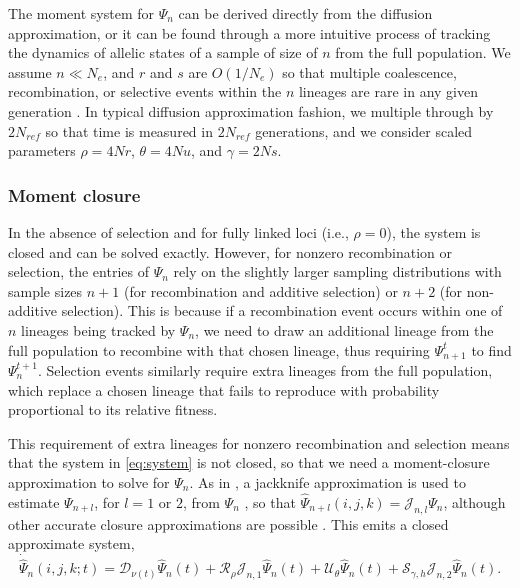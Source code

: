 \documentclass[]{article}
\begin{document}
The moment system for \(\Psi_n\) can be derived directly from the diffusion
approximation, or it can be found through a more intuitive process of tracking
the dynamics of allelic states of a sample of size of \(n\) from the full
population. We assume \(n \ll N_e\), and \(r\) and \(s\) are \(O(1/N_e)\) so
that multiple coalescence, recombination, or selective events within the \(n\)
lineages are rare in any given generation \citep[Supporting
Information;][]{Jouganous2017-pq,Ragsdale2019-nt}. In typical diffusion
approximation fashion, we multiple through by \(2N_{ref}\) so that time is
measured in \(2N_{ref}\) generations, and we consider scaled parameters \(\rho
= 4Nr\), \(\theta = 4Nu\), and \(\gamma=2Ns\).

\subsubsection{Moment closure}\label{moment-closure}

In the absence of selection and for fully linked loci (i.e., \(\rho=0\)), the
system is closed and can be solved exactly. However, for nonzero recombination
or selection, the entries of \(\Psi_n\) rely on the slightly larger sampling
distributions with sample sizes \(n+1\) (for recombination and additive
selection) or \(n+2\) (for non-additive selection). This is because if a
recombination event occurs within one of \(n\) lineages being tracked by
\(\Psi_n\), we need to draw an additional lineage from the full population to
recombine with that chosen lineage, thus requiring \(\Psi_{n+1}^t\) to find
\(\Psi_n^{t+1}\). Selection events similarly require extra lineages from the full
population, which replace a chosen lineage that fails to reproduce with
probability proportional to its relative fitness.

This requirement of extra lineages for nonzero recombination and selection
means that the system in \eqref{eq:system} is not closed, so that we need a
moment-closure approximation to solve for \(\Psi_n\). As in \citet{Ragsdale2019-nt}, a
jackknife approximation is used to estimate \(\Psi_{n+l}\), for \(l=1\) or \(2\),
from \(\Psi_n\) \citep[following the single-locus closure introduced in][]{Jouganous2017-pq}, so that \(\hat{\Psi}_{n+l}(i, j, k) = \mathcal{J}_{n, l}\Psi_n\), although other accurate closure approximations are possible
\citep{Friedlander2022-bs}. This emits a closed approximate system,
\begin{equation}
\label{eq:closed-system}
\dot{\hat\Psi}_n(i, j, k; t) =
\mathcal{D}_{\nu(t)}\hat\Psi_n(t)
+ \mathcal{R}_{\rho}\mathcal{J}_{n, 1}\hat\Psi_{n}(t)
+ \mathcal{U}_{\theta}\hat\Psi_n(t)
+ \mathcal{S}_{\gamma, h}\mathcal{J}_{n, 2}\hat\Psi_{n}(t).
\end{equation}
\end{document}
